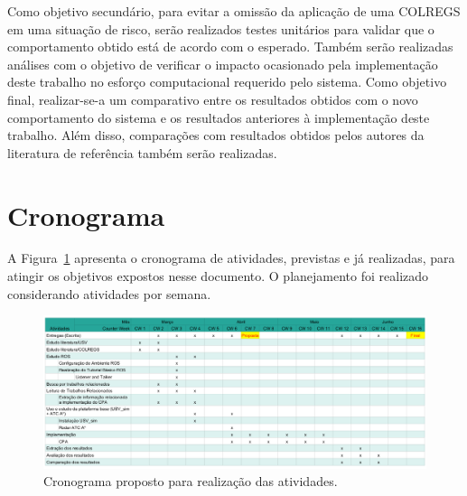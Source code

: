         Como objetivo secundário, para evitar a omissão da aplicação de uma COLREGS em uma situação de risco, serão realizados testes unitários para validar que o comportamento obtido está de acordo com o esperado. Também serão realizadas análises com o objetivo de verificar o impacto ocasionado pela implementação deste trabalho no esforço computacional requerido pelo sistema. Como objetivo final, realizar-se-a um comparativo entre os resultados obtidos com o novo comportamento do sistema e os resultados anteriores à implementação deste trabalho. Além disso, comparações com resultados obtidos pelos autores da literatura de referência também serão realizadas.
        
    \section{Cronograma}
        A Figura~\ref{fig:chap3_schedule} apresenta o cronograma de atividades, previstas e já realizadas, para atingir os objetivos expostos nesse documento. O planejamento foi realizado considerando atividades por semana.
        
        \begin{figure}[htb]
            \centering\includegraphics[width=1.3\textwidth, angle=90]{fig/chap3/schedule.png}
            \caption{\label{fig:chap3_schedule} Cronograma proposto para realização das atividades.}
        \end{figure}